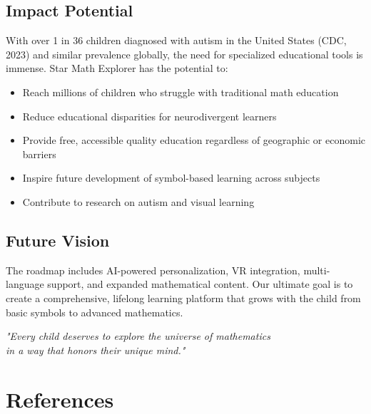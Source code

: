 \documentclass[12pt, a4paper]{article}
\begin{document}
\subsection{Impact Potential}

With over 1 in 36 children diagnosed with autism in the United States (CDC, 2023) and similar prevalence globally, the need for specialized educational tools is immense. Star Math Explorer has the potential to:

\begin{itemize}
    \item Reach millions of children who struggle with traditional math education
    \item Reduce educational disparities for neurodivergent learners
    \item Provide free, accessible quality education regardless of geographic or economic barriers
    \item Inspire future development of symbol-based learning across subjects
    \item Contribute to research on autism and visual learning
\end{itemize}

\subsection{Future Vision}

The roadmap includes AI-powered personalization, VR integration, multi-language support, and expanded mathematical content. Our ultimate goal is to create a comprehensive, lifelong learning platform that grows with the child from basic symbols to advanced mathematics.

\vspace{1cm}

\begin{center}
\textit{"Every child deserves to explore the universe of mathematics \\
in a way that honors their unique mind."}
\end{center}

\newpage
\section{References}
\end{document}
